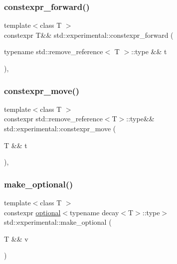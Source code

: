 \subsubsection{\texorpdfstring{constexpr\+\_\+forward()}{constexpr\_forward()}\hspace{0.1cm}{\footnotesize\ttfamily [2/2]}}
{\footnotesize\ttfamily template$<$class T $>$ \\
constexpr T\&\& std\+::experimental\+::constexpr\+\_\+forward (\begin{DoxyParamCaption}\item[{typename std\+::remove\+\_\+reference$<$ T $>$\+::type \&\&}]{t }\end{DoxyParamCaption})\hspace{0.3cm}{\ttfamily [inline]}, {\ttfamily [noexcept]}}

\mbox{\label{namespacestd_1_1experimental_abe16b4d69976581fbfc135b809b3ffe3}} 
\subsubsection{\texorpdfstring{constexpr\+\_\+move()}{constexpr\_move()}}
{\footnotesize\ttfamily template$<$class T $>$ \\
constexpr std\+::remove\+\_\+reference$<$T$>$\+::type\&\& std\+::experimental\+::constexpr\+\_\+move (\begin{DoxyParamCaption}\item[{T \&\&}]{t }\end{DoxyParamCaption})\hspace{0.3cm}{\ttfamily [inline]}, {\ttfamily [noexcept]}}

\mbox{\label{namespacestd_1_1experimental_aa6c8db3625ec5a8e7f6288fb5adf8f95}} 
\subsubsection{\texorpdfstring{make\+\_\+optional()}{make\_optional()}\hspace{0.1cm}{\footnotesize\ttfamily [1/2]}}
{\footnotesize\ttfamily template$<$class T $>$ \\
constexpr \hyperlink{classstd_1_1experimental_1_1optional}{optional}$<$typename decay$<$T$>$\+::type$>$ std\+::experimental\+::make\+\_\+optional (\begin{DoxyParamCaption}\item[{T \&\&}]{v }\end{DoxyParamCaption})}

